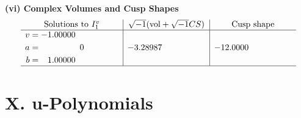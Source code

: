 \documentclass[1p]{elsarticle_modified}
\theoremstyle{definition}
\newcommand{\I}{\sqrt{-1}}
\begin{document}
\newpage\flushleft \textbf{(vi) Complex Volumes and Cusp Shapes}
$$\begin{array}{c|c|c}  
\text{Solutions to }I^v_{1}& \I (\text{vol} + \sqrt{-1}CS) & \text{Cusp shape}\\
 \hline 
\begin{aligned}
v &= -1.00000\phantom{ +0.000000I} \\
a &= \phantom{-0.000000 } 0 \\
b &= \phantom{-}1.00000\phantom{ +0.000000I}\end{aligned}
 & -3.28987\phantom{ +0.000000I} & -12.0000\phantom{ +0.000000I}\\
 \hline 
 \end{array}$$\newpage
\newpage\renewcommand{\arraystretch}{1}
\centering \section*{ X. u-Polynomials}
\end{document}
